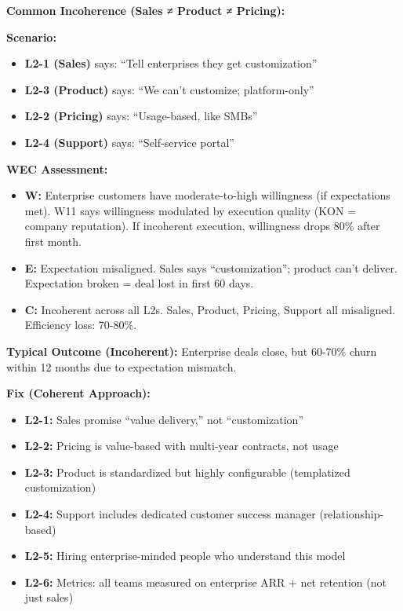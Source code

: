 \documentclass[11pt, a4paper]{article}
\begin{document}
\textbf{Common Incoherence (Sales ≠ Product ≠ Pricing):}

\textbf{Scenario:}
\begin{itemize}[nosep]
    \item \textbf{L2-1 (Sales)} says: ``Tell enterprises they get customization''
    \item \textbf{L2-3 (Product)} says: ``We can't customize; platform-only''
    \item \textbf{L2-2 (Pricing)} says: ``Usage-based, like SMBs''
    \item \textbf{L2-4 (Support)} says: ``Self-service portal''
\end{itemize}

\textbf{WEC Assessment:}
\begin{itemize}[nosep]
    \item \textbf{W:} Enterprise customers have moderate-to-high willingness (if expectations met). W11 says willingness modulated by execution quality (KON = company reputation). If incoherent execution, willingness drops 80\% after first month.
    \item \textbf{E:} Expectation misaligned. Sales says ``customization''; product can't deliver. Expectation broken = deal lost in first 60 days.
    \item \textbf{C:} Incoherent across all L2s. Sales, Product, Pricing, Support all misaligned. Efficiency loss: 70-80\%.
\end{itemize}

\textbf{Typical Outcome (Incoherent):} Enterprise deals close, but 60-70\% churn within 12 months due to expectation mismatch.

\textbf{Fix (Coherent Approach):}
\begin{itemize}[nosep]
    \item \textbf{L2-1:} Sales promise ``value delivery,'' not ``customization''
    \item \textbf{L2-2:} Pricing is value-based with multi-year contracts, not usage
    \item \textbf{L2-3:} Product is standardized but highly configurable (templatized customization)
    \item \textbf{L2-4:} Support includes dedicated customer success manager (relationship-based)
    \item \textbf{L2-5:} Hiring enterprise-minded people who understand this model
    \item \textbf{L2-6:} Metrics: all teams measured on enterprise ARR + net retention (not just sales)
\end{itemize}
\end{document}
